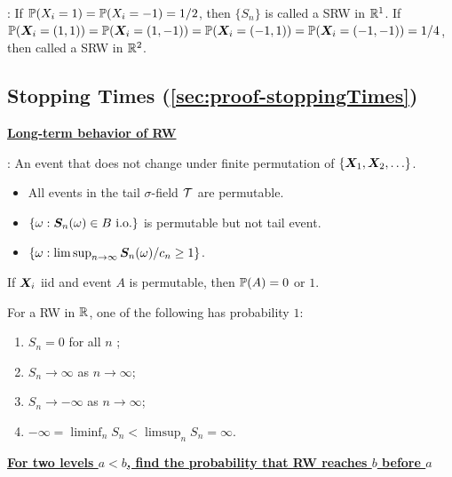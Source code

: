 \documentclass[10pt,a4paper]{article}
\begin{document}
\noindent {}: If $\bbP(X_i=1)=\bbP(X_i=-1)=1/2$, then $\{S_n\}$ is called a SRW in $\bbR^1$. If $\bbP(\X_i=(1,1))=\bbP(\X_i=(1,-1))=\bbP(\X_i=(-1,1))=\bbP(\X_i=(-1,-1))=1/4$, then called a SRW in $\bbR^2$.

\subsection{Stopping Times (\ref{sec:proof-stoppingTimes})}\label{sec:stoppingTimes}

\noindent \underline{\textbf{Long-term behavior of RW}}

\noindent {}: An event that does not change under finite permutation of $\{\X_1,\X_2,\ldots\}$.
\begin{itemize}
	\item All events in the tail $\sigma$-field $\calT$ are permutable.
	\item $\{\omega:\S_{n}(\omega)\in B \ \mathrm{i.o.}\}$ is permutable but not tail event. 
	\item $\{\omega:\lim\sup_{n\to\infty}\S_{n}(\omega)/c_{n}\geq1\}$.
\end{itemize}

\begin{thmbox}
\begin{theorem}\label{thm:HS01Law}
	If $\X_i$ iid and event $A$ is permutable, then $\bbP(A)=0$ or $1$.   
\end{theorem}
\end{thmbox}

\begin{thmbox}
	\begin{theorem}\label{thm:longTermRW-1d}
		For a RW in $\bbR$, one of the following has probability $1$:
		\begin{enumerate}[label=(\roman*)]
			\item $S_n=0$ for all $n$ ;
			\item $S_n\to \infty $ as $n\to \infty $;
			\item $S_n\to - \infty $ as $n\to \infty $;
			\item $- \infty = \liminf_{n} S_n < \limsup_n S_n=\infty $.   
		\end{enumerate}  
	\end{theorem}
\end{thmbox}

\noindent \underline{\textbf{For two levels $a<b$, find the probability that RW reaches $b$ before $a$}}
\end{document}
